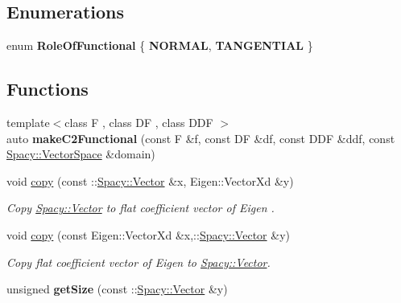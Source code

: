 \subsection*{\-Enumerations}
\begin{DoxyCompactItemize}
\item 
enum {\bfseries \-Role\-Of\-Functional} \{ {\bfseries \-N\-O\-R\-M\-A\-L}, 
{\bfseries \-T\-A\-N\-G\-E\-N\-T\-I\-A\-L}
 \}
\end{DoxyCompactItemize}
\subsection*{\-Functions}
\begin{DoxyCompactItemize}
\item 
\hypertarget{namespaceSpacy_1_1Rn_af1d4ad0f90654bf2e6d3a9a2d3e5ffd1}{{\footnotesize template$<$class F , class D\-F , class D\-D\-F $>$ }\\auto {\bfseries make\-C2\-Functional} (const \-F \&f, const \-D\-F \&df, const \-D\-D\-F \&ddf, const \hyperlink{classSpacy_1_1VectorSpace}{\-Spacy\-::\-Vector\-Space} \&domain)}\label{namespaceSpacy_1_1Rn_af1d4ad0f90654bf2e6d3a9a2d3e5ffd1}

\item 
\hypertarget{namespaceSpacy_1_1Rn_a26ee11182adb7a8103aa502c4bb8a134}{void \hyperlink{namespaceSpacy_1_1Rn_a26ee11182adb7a8103aa502c4bb8a134}{copy} (const \-::\hyperlink{classSpacy_1_1Vector}{\-Spacy\-::\-Vector} \&x, \-Eigen\-::\-Vector\-Xd \&y)}\label{namespaceSpacy_1_1Rn_a26ee11182adb7a8103aa502c4bb8a134}

\begin{DoxyCompactList}\small\item\em \-Copy \hyperlink{classSpacy_1_1Vector}{\-Spacy\-::\-Vector} to flat coefficient vector of \-Eigen . \end{DoxyCompactList}\item 
\hypertarget{namespaceSpacy_1_1Rn_aa1b7ffd8e9af414e4e5118f39971ecc4}{void \hyperlink{namespaceSpacy_1_1Rn_aa1b7ffd8e9af414e4e5118f39971ecc4}{copy} (const \-Eigen\-::\-Vector\-Xd \&x,\-::\hyperlink{classSpacy_1_1Vector}{\-Spacy\-::\-Vector} \&y)}\label{namespaceSpacy_1_1Rn_aa1b7ffd8e9af414e4e5118f39971ecc4}

\begin{DoxyCompactList}\small\item\em \-Copy flat coefficient vector of \-Eigen to \hyperlink{classSpacy_1_1Vector}{\-Spacy\-::\-Vector}. \end{DoxyCompactList}\item 
\hypertarget{namespaceSpacy_1_1Rn_a3f36c8bb8bdede3ff8573631ee7f3e79}{unsigned {\bfseries get\-Size} (const \-::\hyperlink{classSpacy_1_1Vector}{\-Spacy\-::\-Vector} \&y)}\label{namespaceSpacy_1_1Rn_a3f36c8bb8bdede3ff8573631ee7f3e79}


\end{DoxyCompactItemize}
